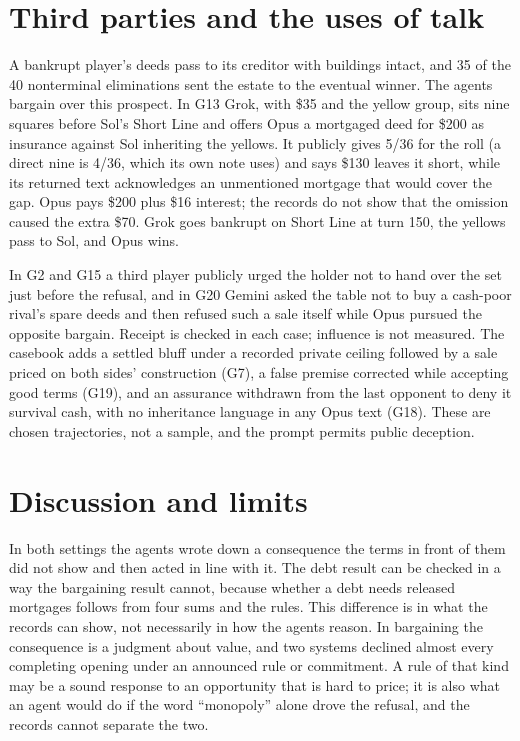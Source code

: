 \documentclass[11pt,letterpaper]{article}
\begin{document}
\section{Third parties and the uses of talk}
A bankrupt player's deeds pass to its creditor with buildings intact, and 35 of the 40 nonterminal eliminations sent the estate to the eventual winner. The agents bargain over this prospect. In G13 Grok, with \$35 and the yellow group, sits nine squares before Sol's Short Line and offers Opus a mortgaged deed for \$200 as insurance against Sol inheriting the yellows. It publicly gives 5/36 for the roll (a direct nine is 4/36, which its own note uses) and says \$130 leaves it short, while its returned text acknowledges an unmentioned mortgage that would cover the gap. Opus pays \$200 plus \$16 interest; the records do not show that the omission caused the extra \$70. Grok goes bankrupt on Short Line at turn 150, the yellows pass to Sol, and Opus wins.

In G2 and G15 a third player publicly urged the holder not to hand over the set just before the refusal, and in G20 Gemini asked the table not to buy a cash-poor rival's spare deeds and then refused such a sale itself while Opus pursued the opposite bargain. Receipt is checked in each case; influence is not measured. The casebook adds a settled bluff under a recorded private ceiling followed by a sale priced on both sides' construction (G7), a false premise corrected while accepting good terms (G19), and an assurance withdrawn from the last opponent to deny it survival cash, with no inheritance language in any Opus text (G18). These are chosen trajectories, not a sample, and the prompt permits public deception.

\section{Discussion and limits}
In both settings the agents wrote down a consequence the terms in front of them did not show and then acted in line with it. The debt result can be checked in a way the bargaining result cannot, because whether a debt needs released mortgages follows from four sums and the rules. This difference is in what the records can show, not necessarily in how the agents reason. In bargaining the consequence is a judgment about value, and two systems declined almost every completing opening under an announced rule or commitment. A rule of that kind may be a sound response to an opportunity that is hard to price; it is also what an agent would do if the word ``monopoly'' alone drove the refusal, and the records cannot separate the two.
\end{document}
